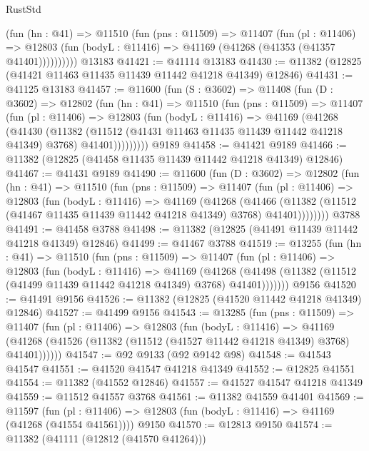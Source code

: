 \begin{lexlean}{RustStd}
\begin{coremodule}
          (fun (hn : @41) =>
          @11510
            (fun (pns : @11509) =>
            @11407
              (fun (pl : @11406) =>
              @12803 (fun (bodyL : @11416) => @41169 (@41268 (@41353 (@41357 @41401))))))))))
    @13183
@41421 := @41114 @13183
@41430 := @11382 (@12825 (@41421 @11463 @11435 @11439 @11442 @41218 @41349) @12846)
@41431 := @41125 @13183
@41457 := @11600
    (fun (S : @3602) =>
    @11408
      (fun (D : @3602) =>
      @12802
        (fun (hn : @41) =>
        @11510
          (fun (pns : @11509) =>
          @11407
            (fun (pl : @11406) =>
            @12803
              (fun (bodyL : @11416) =>
              @41169
                (@41268
                  (@41430
                    (@11382
                      (@11512 (@41431 @11463 @11435 @11439 @11442 @41218 @41349) @3768)
                      @41401)))))))))
    @9189
@41458 := @41421 @9189
@41466 := @11382 (@12825 (@41458 @11435 @11439 @11442 @41218 @41349) @12846)
@41467 := @41431 @9189
@41490 := @11600
    (fun (D : @3602) =>
    @12802
      (fun (hn : @41) =>
      @11510
        (fun (pns : @11509) =>
        @11407
          (fun (pl : @11406) =>
          @12803
            (fun (bodyL : @11416) =>
            @41169
              (@41268
                (@41466
                  (@11382 (@11512 (@41467 @11435 @11439 @11442 @41218 @41349) @3768) @41401))))))))
    @3788
@41491 := @41458 @3788
@41498 := @11382 (@12825 (@41491 @11439 @11442 @41218 @41349) @12846)
@41499 := @41467 @3788
@41519 := @13255
    (fun (hn : @41) =>
    @11510
      (fun (pns : @11509) =>
      @11407
        (fun (pl : @11406) =>
        @12803
          (fun (bodyL : @11416) =>
          @41169
            (@41268
              (@41498 (@11382 (@11512 (@41499 @11439 @11442 @41218 @41349) @3768) @41401)))))))
    @9156
@41520 := @41491 @9156
@41526 := @11382 (@12825 (@41520 @11442 @41218 @41349) @12846)
@41527 := @41499 @9156
@41543 := @13285
    (fun (pns : @11509) =>
    @11407
      (fun (pl : @11406) =>
      @12803
        (fun (bodyL : @11416) =>
        @41169 (@41268 (@41526 (@11382 (@11512 (@41527 @11442 @41218 @41349) @3768) @41401))))))
@41547 := @92 @9133 (@92 @9142 @98)
@41548 := @41543 @41547
@41551 := @41520 @41547 @41218 @41349
@41552 := @12825 @41551
@41554 := @11382 (@41552 @12846)
@41557 := @41527 @41547 @41218 @41349
@41559 := @11512 @41557 @3768
@41561 := @11382 @41559 @41401
@41569 := @11597
    (fun (pl : @11406) => @12803 (fun (bodyL : @11416) => @41169 (@41268 (@41554 @41561))))
    @9150
@41570 := @12813 @9150
@41574 := @11382 (@41111 (@12812 (@41570 @41264)))

\end{coremodule}
\end{lexlean}
